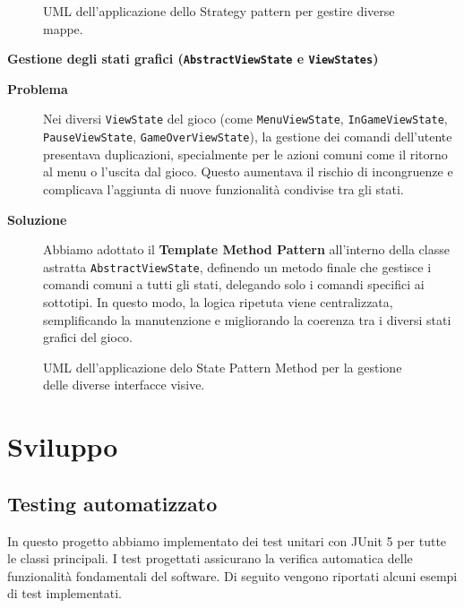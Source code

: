 \documentclass[a4paper,12pt]{report}
\begin{document}
\begin{figure}[H]
	\centering{}
	
	\caption{UML dell'applicazione dello Strategy pattern per gestire diverse mappe.}
	\label{img:GameMapsManager}
\end{figure}
\newpage
\noindent
\textbf{Gestione degli stati grafici (\texttt{AbstractViewState} e \texttt{ViewStates})}
\begin{description}
	\item[\textbf{Problema}]
	      Nei diversi \texttt{ViewState} del gioco (come \texttt{MenuViewState}, \newline \texttt{InGameViewState}, \texttt{PauseViewState}, \texttt{GameOverViewState}), la gestione dei comandi dell'utente
	      presentava duplicazioni, specialmente per le azioni comuni come il ritorno al menu o l'uscita dal gioco. Questo aumentava il rischio di incongruenze e complicava l'aggiunta di nuove
	      funzionalità condivise tra gli stati.

	\item[\textbf{Soluzione}]
	      Abbiamo adottato il \textbf{Template Method Pattern} all'interno della classe astratta \texttt{AbstractViewState}, definendo un metodo finale che gestisce i comandi comuni a tutti gli stati,
	      delegando solo i comandi specifici ai sottotipi. In questo modo, la logica ripetuta viene centralizzata, semplificando la manutenzione e migliorando la coerenza tra i diversi stati grafici del gioco.
\end{description}
\begin{figure}[H]
	\centering{}
	
	\caption{UML dell'applicazione delo State Pattern Method per la gestione delle diverse interfacce visive.}
	\label{img:AbstractViewState}
\end{figure}
\newpage
\chapter{Sviluppo}
\section{Testing automatizzato}
In questo progetto abbiamo implementato dei test unitari con JUnit 5 per tutte le classi principali. I test progettati assicurano la verifica automatica delle funzionalità fondamentali del software. Di seguito vengono riportati alcuni esempi di test implementati.
\end{document}
